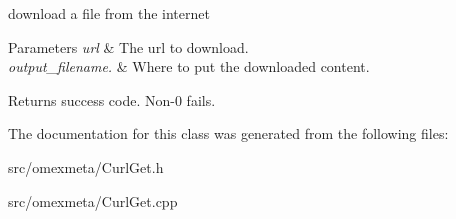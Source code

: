 download a file from the internet 


\begin{DoxyParams}{Parameters}
{\em url} & The url to download. \\
\hline
{\em output\+\_\+filename.} & Where to put the downloaded content. \\
\hline
\end{DoxyParams}
\begin{DoxyReturn}{Returns}
success code. Non-\/0 fails. 
\end{DoxyReturn}


The documentation for this class was generated from the following files\+:\begin{DoxyCompactItemize}
\item 
src/omexmeta/Curl\+Get.\+h\item 
src/omexmeta/Curl\+Get.\+cpp\end{DoxyCompactItemize}
